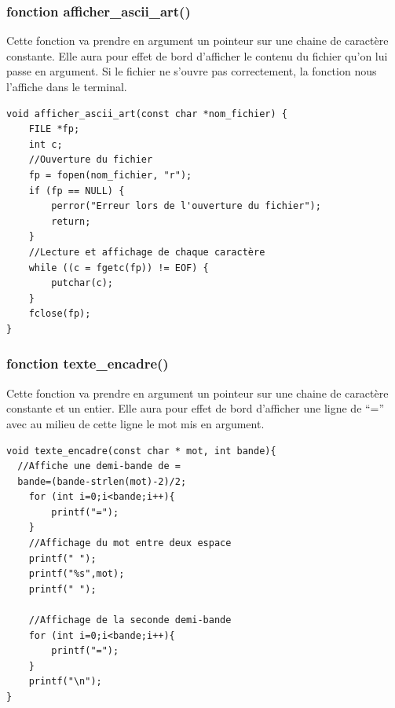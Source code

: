 \documentclass[10pt,a4paper,french,titlepage]{article}
\begin{document}
\subsubsection{fonction afficher\_ascii\_art()}
Cette fonction va prendre en argument un pointeur sur une chaine de caractère constante. Elle aura pour effet de bord d'afficher le contenu du fichier qu'on lui passe en argument. Si le fichier ne s'ouvre pas correctement, la fonction nous l'affiche dans le terminal.
\begin{lstlisting}
void afficher_ascii_art(const char *nom_fichier) {
    FILE *fp;
    int c;
    //Ouverture du fichier
    fp = fopen(nom_fichier, "r");
    if (fp == NULL) {
        perror("Erreur lors de l'ouverture du fichier");
        return;
    }
    //Lecture et affichage de chaque caractère 
    while ((c = fgetc(fp)) != EOF) {
        putchar(c);
    }
    fclose(fp);
}
\end{lstlisting}
\subsubsection{fonction texte\_encadre()}
Cette fonction va prendre en argument un pointeur sur une chaine de caractère constante et un entier. Elle aura pour effet de bord d'afficher une ligne de “=” avec au milieu de cette ligne le mot mis en argument.
\begin{lstlisting}
void texte_encadre(const char * mot, int bande){
  //Affiche une demi-bande de =
  bande=(bande-strlen(mot)-2)/2;
    for (int i=0;i<bande;i++){
        printf("=");
    }
    //Affichage du mot entre deux espace
    printf(" ");
    printf("%s",mot);
    printf(" ");
  
    //Affichage de la seconde demi-bande
    for (int i=0;i<bande;i++){
        printf("=");
    }
    printf("\n");
}
\end{lstlisting}
\newpage
\end{document}
